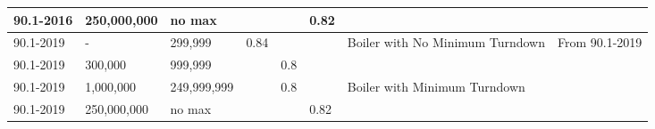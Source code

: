 \begin{table}[htbp]
\begin{tabular}{|p{0.5in}|p{0.5in}|p{1.7cm}|p{0.5in}|p{0.5in}|p{0.5in}|p{1in}|p{0.5in}|}
90.1-2016           & 250,000,000 & no max &      &      & 0.82 &                                                     &                                   \\ \hline
90.1-2019           & -           & 299,999       & 0.84 &      &      & \multirow{2}{*}{\parbox{1in}{Boiler with No Minimum Turndown}}  & \multirow{4}{*}{\parbox{0.5in}{From   90.1-2019}} \\ \cline{1-6}
90.1-2019           & 300,000     & 999,999       &      & 0.8  &      &                                                     &                                   \\ \cline{1-7}
90.1-2019           & 1,000,000   & 249,999,999   &      & 0.8  &      & \multirow{2}{*}{\parbox{1in}{Boiler with Minimum Turndown}}     &                                   \\ \cline{1-6}
90.1-2019           & 250,000,000 & no max &      &      & 0.82 &                                                     &                                   \\ \hline
\end{tabular}
\end{table}
